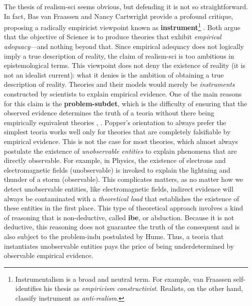\documentclass[./main_en.tex]{subfiles}
\begin{document}
\par The thesis of \gls{realism-sci} seems obvious, but defending it is not so straightforward. In fact, Bas van Fraassen \cite{bas1980} and Nancy Cartwright \cite{nancy1983} provide a profound critique, proposing a radically empiricist viewpoint known as \textbf{\gls{instrument}}\footnote{Instrumentalism is a broad and neutral term. For example, van Fraassen self-identifies his thesis as \textit{\gls{empiricism} constructivist}. Realists, on the other hand, classify \gls{instrument} as \textit{anti-realism}.} \cite{sep-constructive-empiricism}. Both argue that the objective of Science is to produce theories that exhibit \textit{empirical adequacy}—and nothing beyond that. Since empirical adequacy does not logically imply a true description of reality, the claim of \gls{realism-sci} is too ambitious in epistemological terms. This viewpoint does not deny the existence of reality (it is not an idealist current): what it denies is the ambition of obtaining a true description of reality. Theories and their models would merely be \textit{instruments} constructed by scientists to explain empirical evidence. One of the main reasons for this claim is the \textbf{\gls{problem-subdet}}, which is the difficulty of ensuring that the observed evidence determines the truth of a \gls{teoria} without there being empirically equivalent theories \cite{sep-scientific-underdet}, \cite{Tulodziecki2017}. Popper's orientation to always prefer the simplest \gls{teoria} works well only for theories that are completely falsifiable by empirical evidence. This is not the case for most theories, which almost always postulate the existence of \textit{unobservable entities} to explain phenomena that are directly observable. For example, in Physics, the existence of electrons and electromagnetic fields (unobservable) is invoked to explain the lightning and thunder of a storm (observable). This complicates matters, as no matter how we detect unobservable entities, like electromagnetic fields, indirect evidence will always be contaminated with a \textit{theoretical load} that establishes the existence of these entities in the first place. This type of theoretical approach involves a kind of reasoning that is non-deductive, called \textbf{\gls{ibe}}, or abduction. Because it is not deductive, this reasoning does not guarantee the truth of the consequent and is also subject to the \gls{problem-indu} postulated by Hume. Thus, a \gls{teoria} that instantiates unobservable entities pays the price of being underdetermined by observable empirical evidence.
\end{document}
